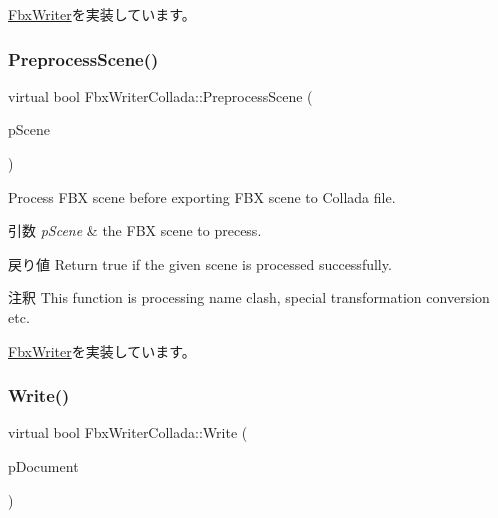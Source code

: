 \hyperlink{class_fbx_writer_a1cfdf59f72ebe777484862e4b64b5d65}{Fbx\+Writer}を実装しています。

\mbox{\label{class_fbx_writer_collada_aee5b9934adfdd982e0c33373ddf77121}} 
\subsubsection{\texorpdfstring{Preprocess\+Scene()}{PreprocessScene()}}
{\footnotesize\ttfamily virtual bool Fbx\+Writer\+Collada\+::\+Preprocess\+Scene (\begin{DoxyParamCaption}\item[{\hyperlink{class_fbx_scene}{Fbx\+Scene} \&}]{p\+Scene }\end{DoxyParamCaption})\hspace{0.3cm}{\ttfamily [virtual]}}

Process F\+BX scene before exporting F\+BX scene to Collada file. 
\begin{DoxyParams}{引数}
{\em p\+Scene} & the F\+BX scene to precess. \\
\hline
\end{DoxyParams}
\begin{DoxyReturn}{戻り値}
Return true if the given scene is processed successfully. 
\end{DoxyReturn}
\begin{DoxyRemark}{注釈}
This function is processing name clash, special transformation conversion etc. 
\end{DoxyRemark}


\hyperlink{class_fbx_writer_a0fd62ec785e7108924975591ee8fbf30}{Fbx\+Writer}を実装しています。

\mbox{\label{class_fbx_writer_collada_aaf5a632f5fa72c521d578ad17ae0aea1}} 
\subsubsection{\texorpdfstring{Write()}{Write()}}
{\footnotesize\ttfamily virtual bool Fbx\+Writer\+Collada\+::\+Write (\begin{DoxyParamCaption}\item[{\hyperlink{class_fbx_document}{Fbx\+Document} $\ast$}]{p\+Document }\end{DoxyParamCaption})\hspace{0.3cm}{\ttfamily [virtual]}}

